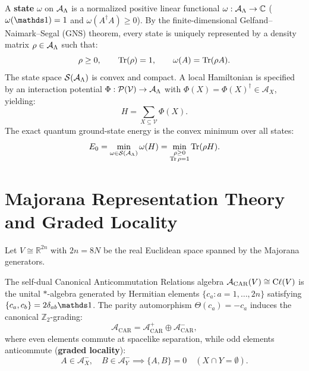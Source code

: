 A \textbf{state} $\omega$ on $\mathcal{A}_{\Lambda}$ is a normalized positive linear functional $\omega: \mathcal{A}_{\Lambda} \to \mathbb{C}$ ($\omega(\Id) = 1$ and $\omega(A^\dagger A) \ge 0$). By the finite-dimensional Gelfand--Naimark--Segal (GNS) theorem, every state is uniquely represented by a density matrix $\rho \in \mathcal{A}_{\Lambda}$ such that:
\begin{equation}
\label{eq:m1_1b_density_matrix}
\rho \ge 0, \qquad \operatorname{Tr}(\rho) = 1, \qquad \omega(A) = \operatorname{Tr}(\rho A).
\end{equation}
The state space $\mathcal{S}(\mathcal{A}_{\Lambda})$ is convex and compact. A local Hamiltonian is specified by an interaction potential $\Phi: \mathcal{P}(\mathcal{V}) \to \mathcal{A}_{\Lambda}$ with $\Phi(X) = \Phi(X)^\dagger \in \mathcal{A}_X$, yielding:
\begin{equation}
\label{eq:m1_1b_hamiltonian_general}
H = \sum_{X \subseteq \mathcal{V}} \Phi(X).
\end{equation}
The exact quantum ground-state energy is the convex minimum over all states:
\begin{equation}
\label{eq:m1_1b_exact_variational_energy}
E_0 = \min_{\omega \in \mathcal{S}(\mathcal{A}_{\Lambda})} \omega(H) = \min_{\substack{\rho \ge 0 \\ \operatorname{Tr}\rho = 1}} \operatorname{Tr}(\rho H).
\end{equation}

\section{Majorana Representation Theory and Graded Locality}
\label{sec:m1_1b_representation_theory}
Let $V \cong \mathbb{R}^{2n}$ with $2n = 8N$ be the real Euclidean space spanned by the Majorana generators.

\begin{definition}
\label{def:m1_1b_car_grading}
The self-dual Canonical Anticommutation Relations algebra $\mathcal{A}_{\mathrm{CAR}}(V) \cong \mathrm{C}\ell(V)$ is the unital $*$-algebra generated by Hermitian elements $\{c_a : a = 1, \dots, 2n\}$ satisfying $\{c_a, c_b\} = 2\delta_{ab}\Id$. The parity automorphism $\Theta(c_a) = -c_a$ induces the canonical $\mathbb{Z}_2$-grading:
\begin{equation}
\label{eq:m1_1b_z2_grading}
\mathcal{A}_{\mathrm{CAR}} = \mathcal{A}_{\mathrm{CAR}}^+ \oplus \mathcal{A}_{\mathrm{CAR}}^-,
\end{equation}
where even elements commute at spacelike separation, while odd elements anticommute (\textbf{graded locality}):
\begin{equation}
\label{eq:m1_1b_graded_locality}
A \in \mathcal{A}_X^-, \quad B \in \mathcal{A}_Y^- \implies \{A, B\} = 0 \quad (X \cap Y = \emptyset).
\end{equation}
\end{definition}

